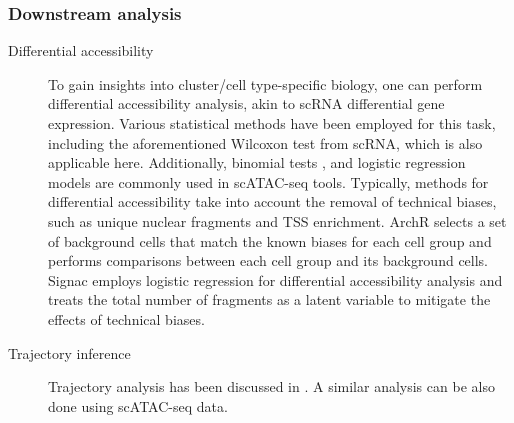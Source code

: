 \subsubsection{Downstream analysis}
\label{background:sec2:atac_downstream}
\begin{description}
	\item[Differential accessibility] 
	To gain insights into cluster/cell type-specific biology, one can perform differential accessibility analysis, akin to scRNA differential gene expression. Various statistical methods have been employed for this task, including the aforementioned Wilcoxon test from scRNA, which is also applicable here. Additionally, binomial tests \citep{cusanovich2018single}, and logistic regression models \citep{hao2021seurat4} are commonly used in scATAC-seq tools. Typically, methods for differential accessibility take into account the removal of technical biases, such as unique nuclear fragments and TSS enrichment. ArchR \citep{Granja2021} selects a set of background cells that match the known biases for each cell group and performs comparisons between each cell group and its background cells. Signac \citep{hao2021seurat4} employs logistic regression for differential accessibility analysis and treats the total number of fragments as a latent variable to mitigate the effects of technical biases.
	
	\item[Trajectory inference]
	Trajectory analysis has been discussed in . A similar analysis can be also done using scATAC-seq data.


\end{description}
